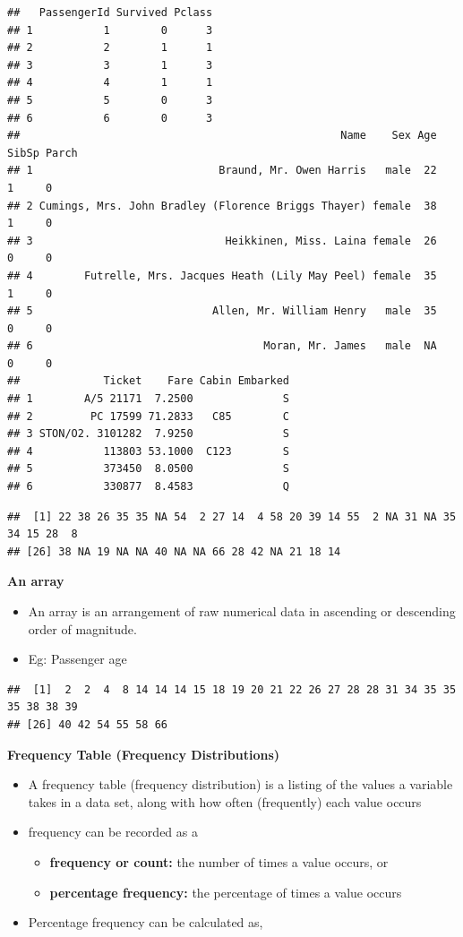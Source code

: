 \documentclass[]{book}
\providecommand{\tightlist}{%
  \setlength{\itemsep}{0pt}\setlength{\parskip}{0pt}}
\begin{document}
\begin{verbatim}
##   PassengerId Survived Pclass
## 1           1        0      3
## 2           2        1      1
## 3           3        1      3
## 4           4        1      1
## 5           5        0      3
## 6           6        0      3
##                                                  Name    Sex Age SibSp Parch
## 1                             Braund, Mr. Owen Harris   male  22     1     0
## 2 Cumings, Mrs. John Bradley (Florence Briggs Thayer) female  38     1     0
## 3                              Heikkinen, Miss. Laina female  26     0     0
## 4        Futrelle, Mrs. Jacques Heath (Lily May Peel) female  35     1     0
## 5                            Allen, Mr. William Henry   male  35     0     0
## 6                                    Moran, Mr. James   male  NA     0     0
##             Ticket    Fare Cabin Embarked
## 1        A/5 21171  7.2500              S
## 2         PC 17599 71.2833   C85        C
## 3 STON/O2. 3101282  7.9250              S
## 4           113803 53.1000  C123        S
## 5           373450  8.0500              S
## 6           330877  8.4583              Q
\end{verbatim}

\begin{verbatim}
##  [1] 22 38 26 35 35 NA 54  2 27 14  4 58 20 39 14 55  2 NA 31 NA 35 34 15 28  8
## [26] 38 NA 19 NA NA 40 NA NA 66 28 42 NA 21 18 14
\end{verbatim}

\textbf{An array}

\begin{itemize}
\tightlist
\item
  An array is an arrangement of raw numerical data in ascending or descending order of magnitude.
\item
  Eg: Passenger age
\end{itemize}

\begin{verbatim}
##  [1]  2  2  4  8 14 14 14 15 18 19 20 21 22 26 27 28 28 31 34 35 35 35 38 38 39
## [26] 40 42 54 55 58 66
\end{verbatim}

\textbf{Frequency Table (Frequency Distributions)}

\begin{itemize}
\tightlist
\item
  A frequency table (frequency distribution) is a listing of the values a variable takes in a data set, along with how often (frequently) each value occurs
\item
  frequency can be recorded as a

  \begin{itemize}
  \tightlist
  \item
    \textbf{frequency or count:} the number of times a value occurs, or
  \item
    \textbf{percentage frequency:} the percentage of times a value occurs
  \end{itemize}
\item
  Percentage frequency can be calculated as,
\end{itemize}
\end{document}
